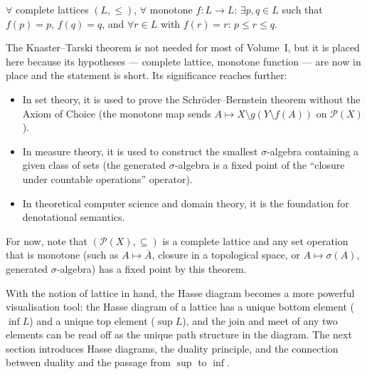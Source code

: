 \begin{remark*}
$\forall$ complete lattices $(L,\leq)$, $\forall$ monotone $f : L \to L$:
$\exists p, q \in L$ such that $f(p) = p$, $f(q) = q$, and $\forall r \in L$
with $f(r) = r$: $p \leq r \leq q$.
\end{remark*}

\begin{remark*}
\label{rem:knaster-tarski-context}
The Knaster--Tarski theorem is not needed for most of Volume~I, but it is
placed here because its hypotheses — complete lattice, monotone function —
are now in place and the statement is short.  Its significance reaches
further:
\begin{itemize}
  \item In set theory, it is used to prove the Schröder--Bernstein theorem
        without the Axiom of Choice (the monotone map sends $A \mapsto
        X \setminus g(Y \setminus f(A))$ on $\mathcal{P}(X)$).
  \item In measure theory, it is used to construct the smallest
        $\sigma$-algebra containing a given class of sets (the
        generated $\sigma$-algebra is a fixed point of the ``closure
        under countable operations'' operator).
  \item In theoretical computer science and domain theory, it is the
        foundation for denotational semantics.
\end{itemize}
For now, note that $(\mathcal{P}(X), \subseteq)$ is a complete lattice and
any set operation that is monotone (such as $A \mapsto \overline{A}$, closure
in a topological space, or $A \mapsto \sigma(A)$, generated $\sigma$-algebra)
has a fixed point by this theorem.
\end{remark*}

\begin{remark*}[Transition]
\label{rem:transition-to-hasse}
With the notion of lattice in hand, the Hasse diagram becomes a more powerful
visualisation tool: the Hasse diagram of a lattice has a unique bottom element
($\inf L$) and a unique top element ($\sup L$), and the join and meet of any
two elements can be read off as the unique path structure in the diagram.
The next section introduces Hasse diagrams, the duality principle, and the
connection between duality and the passage from $\sup$ to $\inf$.
\end{remark*}
